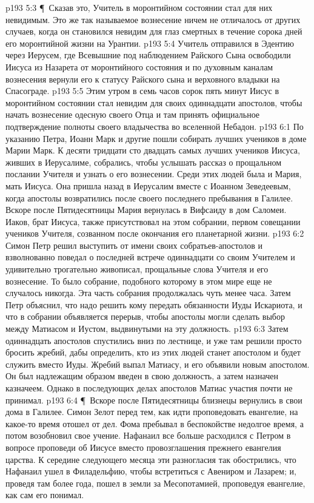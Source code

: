 \vs p193 5:3 \P\ Сказав это, Учитель в моронтийном состоянии стал для них невидимым. Это же так называемое вознесение ничем не отличалось от других случаев, когда он становился невидим для глаз смертных в течение сорока дней его моронтийной жизни на Урантии.
\vs p193 5:4 Учитель отправился в Эдентию через Иерусем, где Всевышние под наблюдением Райского Сына освободили Иисуса из Назарета от моронтийного состояния и по духовным каналам вознесения вернули его к статусу Райского сына и верховного владыки на Спасограде.
\vs p193 5:5 Этим утром в семь часов сорок пять минут Иисус в моронтийном состоянии стал невидим для своих одиннадцати апостолов, чтобы начать вознесение одесную своего Отца и там принять официальное подтверждение полноты своего владычества во вселенной Небадон.
\vs p193 6:1 По указанию Петра, Иоанн Марк и другие пошли собирать лучших учеников в доме Марии Марк. К десяти тридцати сто двадцать самых лучших учеников Иисуса, живших в Иерусалиме, собрались, чтобы услышать рассказ о прощальном послании Учителя и узнать о его вознесении. Среди этих людей была и Мария, мать Иисуса. Она пришла назад в Иерусалим вместе с Иоанном Зеведеевым, когда апостолы возвратились после своего последнего пребывания в Галилее. Вскоре после Пятидесятницы Мария вернулась в Вифсаиду в дом Саломеи. Иаков, брат Иисуса, также присутствовал на этом собрании, первом совещании учеников Учителя, созванном после окончания его планетарной жизни.
\vs p193 6:2 Симон Петр решил выступить от имени своих собратьев\hyp{}апостолов и взволнованно поведал о последней встрече одиннадцати со своим Учителем и удивительно трогательно живописал, прощальные слова Учителя и его вознесение. То было собрание, подобного которому в этом мире еще не случалось никогда. Эта часть собрания продолжалась чуть менее часа. Затем Петр объяснил, что надо решить кому передать обязанности Иуды Искариота, и что в собрании объявляется перерыв, чтобы апостолы могли сделать выбор между Матиасом и Иустом, выдвинутыми на эту должность.
\vs p193 6:3 Затем одиннадцать апостолов спустились вниз по лестнице, и уже там решили просто бросить жребий, дабы определить, кто из этих людей станет апостолом и будет служить вместо Иуды. Жребий выпал Матиасу, и его объявили новым апостолом. Он был надлежащим образом введен в свою должность, а затем назначен казначеем. Однако в последующих делах апостолов Матиас участия почти не принимал.
\vs p193 6:4 \P\ Вскоре после Пятидесятницы близнецы вернулись в свои дома в Галилее. Симон Зелот перед тем, как идти проповедовать евангелие, на какое\hyp{}то время отошел от дел. Фома пребывал в беспокойстве недолгое время, а потом возобновил свое учение. Нафанаил все больше расходился с Петром в вопросе проповеди об Иисусе вместо провозглашения прежнего евангелия царства. К середине следующего месяца эти разногласия так обострились, что Нафанаил ушел в Филадельфию, чтобы встретиться с Авениром и Лазарем; и, проведя там более года, пошел в земли за Месопотамией, проповедуя евангелие, как сам его понимал.
